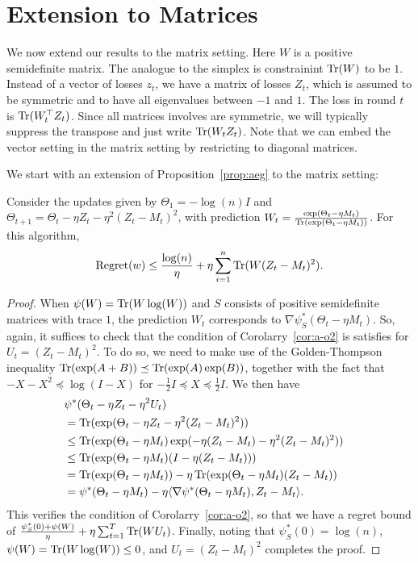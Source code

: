 \documentclass[paper_icml.tex]{subfiles}
\begin{document}
\section{Extension to Matrices} 
\label{sec:matrix}
We now extend our results to the matrix setting. Here $W$ is a positive semidefinite 
matrix. The analogue to the simplex is constrainint $\operatorname{Tr}(W)$ to be $1$. Instead of a vector 
of losses $z_t$, we have a matrix of losses $Z_t$, which is assumed to be symmetric and to 
have all eigenvalues between $-1$ and $1$. The loss in round $t$ is $\operatorname{Tr}(W_t^{\top}Z_t)$. 
Since all matrices involves are symmetric, we will typically suppress the transpose and 
just write $\operatorname{Tr}(W_tZ_t)$. Note that we can embed the vector setting in the matrix setting 
by restricting to diagonal matrices.

We start with an extension of Proposition~\ref{prop:aeg} to the matrix setting:
\begin{proposition}
\label{prop:maeg}
Consider the updates given by $\Theta_1 = -\log(n)I$ and 
$\Theta_{t+1} = \Theta_t - \eta Z_t - \eta^2 (Z_t - M_t)^2$, 
with prediction $W_t = \frac{\exp(\Theta_t - \eta M_t)}{\operatorname{Tr}(\exp(\Theta_t - \eta M_t))}$. For this algorithm,
\begin{equation}
\operatorname{Regret}(w) \leq \frac{\log(n)}{\eta} + \eta \sum_{i=1}^n \operatorname{Tr}(W(Z_t-M_t)^2).
\end{equation}
\end{proposition}
\begin{proof}
When $\psi(W) = \operatorname{Tr}(W\log(W))$ and $S$ consists of positive semidefinite 
matrices with trace $1$, the prediction $W_t$ corresponds to 
$\nabla \psi_S^*(\Theta_t - \eta M_t)$. So, again, it suffices to check 
that the condition of Corolarry~\ref{cor:a-o2} is satisfies for 
$U_t = (Z_t - M_t)^2$. To do so, we need to make use of the 
Golden-Thompson inequality $\operatorname{Tr}(\exp(A+B)) \preceq \operatorname{Tr}(\exp(A)\exp(B))$, 
together with the fact that $-X-X^2 \preceq \log(I-X)$ for 
$-\frac{1}{2}I \preceq X \preceq \frac{1}{2}I$. We then have
\begin{align*}
\lefteqn{\psi^*(\Theta_t - \eta Z_t - \eta^2 U_t)} \\
 &= \Tr(\exp(\Theta_t - \eta Z_t - \eta^2 (Z_t - M_t)^2)) \\
 &\leq \Tr(\exp(\Theta_t - \eta M_t)\exp(-\eta (Z_t - M_t) - \eta^2 (Z_t - M_t)^2)) \\
 &\leq \Tr(\exp(\Theta_t - \eta M_t)(I - \eta (Z_t - M_t))) \\
 &= \Tr(\exp(\Theta_t - \eta M_t)) - \eta \Tr(\exp(\Theta_t - \eta M_t)(Z_t - M_t)) \\
 &= \psi^*(\Theta_t - \eta M_t) - \eta \langle \nabla \psi^*(\Theta_t - \eta M_t), Z_t - M_t \rangle.
\end{align*}
This verifies the condition of Corolarry~\ref{cor:a-o2}, so that we have 
a regret bound of $\frac{\psi_S^*(0) + \psi(W)}{\eta} + \eta \sum_{t=1}^T \operatorname{Tr}(WU_t)$. 
Finally, noting that $\psi_S^*(0) = \log(n)$, $\psi(W) = \operatorname{Tr}(W\log(W)) \leq 0$, and 
$U_t = (Z_t - M_t)^2$ completes the proof.
\end{proof}
\end{document}
